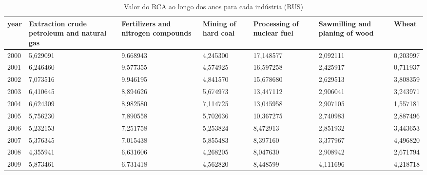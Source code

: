\begin{table}
\centering
\caption{Valor do RCA ao longo dos anos para cada indústria (RUS)}
\begin{tabular}{p{1cm}p{2cm}p{2cm}p{2cm}p{2cm}p{2cm}p{2cm}}
\toprule
 year &  Extraction crude petroleum and natural gas &  Fertilizers and nitrogen compounds &  Mining of hard coal &  Processing of nuclear fuel &  Sawmilling and planing of wood &    Wheat \\
\midrule
 2000 &                                    5,629091 &                            9,668943 &             4,245300 &                   17,148577 &                        2,092111 & 0,203997 \\
 2001 &                                    6,246460 &                            9,577355 &             4,574925 &                   16,597258 &                        2,425917 & 0,711937 \\
 2002 &                                    7,073516 &                            9,946195 &             4,841570 &                   15,678680 &                        2,629513 & 3,808359 \\
 2003 &                                    6,410645 &                            8,894626 &             5,674973 &                   13,447112 &                        2,906041 & 3,243971 \\
 2004 &                                    6,624309 &                            8,982580 &             7,114725 &                   13,045958 &                        2,907105 & 1,557181 \\
 2005 &                                    5,756230 &                            7,890558 &             5,702636 &                   10,367275 &                        2,740983 & 2,887496 \\
 2006 &                                    5,232153 &                            7,251758 &             5,253824 &                    8,472913 &                        2,851932 & 3,443653 \\
 2007 &                                    5,376345 &                            7,015438 &             5,855483 &                    8,397160 &                        3,377967 & 4,496820 \\
 2008 &                                    4,355941 &                            6,631606 &             4,268205 &                    8,047630 &                        2,908942 & 2,671794 \\
 2009 &                                    5,873461 &                            6,731418 &             4,562820 &                    8,448599 &                        4,111696 & 4,218718 \\

\end{tabular}
\end{table}
